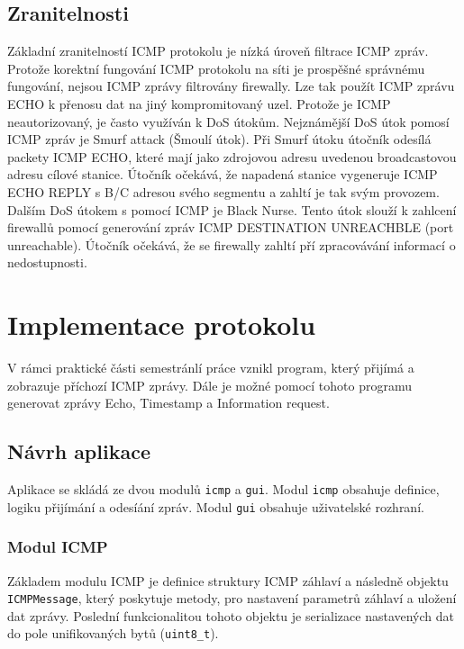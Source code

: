 \documentclass[12pt, a4paper]{article}
\begin{document}
\subsection{Zranitelnosti}

Základní zranitelností ICMP protokolu je nízká úroveň filtrace ICMP zpráv. Protože korektní fungování ICMP protokolu na síti je prospěšné správnému fungování, nejsou ICMP zprávy filtrovány firewally. Lze tak použít ICMP zprávu ECHO k přenosu dat na jiný kompromitovaný uzel. Protože je ICMP neautorizovaný, je často využíván k DoS útokům. 
Nejznámější DoS útok pomosí ICMP zpráv je Smurf attack (Šmoulí útok). Při Smurf útoku útočník odesílá packety ICMP ECHO, které mají jako zdrojovou adresu uvedenou broadcastovou adresu cílové stanice. Útočník očekává, že napadená stanice vygeneruje ICMP ECHO REPLY s B/C adresou svého segmentu a zahltí je tak svým provozem.
Dalším DoS útokem s pomocí ICMP je Black Nurse. Tento útok slouží k zahlcení firewallů pomocí generování zpráv ICMP DESTINATION UNREACHBLE (port unreachable). Útočník očekává, že se firewally zahltí pří zpracovávání informací o nedostupnosti.

\section{Implementace protokolu}

V rámci praktické části semestránlí práce vznikl program, který přijímá a zobrazuje příchozí ICMP zprávy. Dále je možné pomocí tohoto programu generovat zprávy Echo, Timestamp a Information request.  

\subsection{Návrh aplikace}

Aplikace se skládá ze dvou modulů \texttt{icmp} a \texttt{gui}. Modul \texttt{icmp} obsahuje definice, logiku přijímání a odesíání zpráv. Modul \texttt{gui} obsahuje uživatelské rozhraní.

\subsubsection{Modul ICMP}

Základem modulu ICMP je definice struktury ICMP záhlaví a následně objektu \texttt{ICMPMessage}, který poskytuje metody, pro nastavení parametrů záhlaví a uložení dat zprávy. Poslední funkcionalitou tohoto objektu je serializace nastavených dat do pole unifikovaných bytů (\texttt{uint8\_t}).
\end{document}
